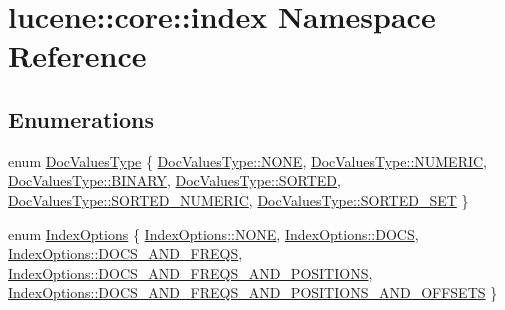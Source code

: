 \hypertarget{namespacelucene_1_1core_1_1index}{}\section{lucene\+:\+:core\+:\+:index Namespace Reference}
\label{namespacelucene_1_1core_1_1index}
\subsection*{Enumerations}
\begin{DoxyCompactItemize}
\item 
enum \mbox{\hyperlink{namespacelucene_1_1core_1_1index_a2f7ffaef6429b5df542c8aa12f8b9883}{Doc\+Values\+Type}} \{ \newline
\mbox{\hyperlink{namespacelucene_1_1core_1_1index_a2f7ffaef6429b5df542c8aa12f8b9883ab50339a10e1de285ac99d4c3990b8693}{Doc\+Values\+Type\+::\+N\+O\+NE}}, 
\mbox{\hyperlink{namespacelucene_1_1core_1_1index_a2f7ffaef6429b5df542c8aa12f8b9883ab22f521f17b09d0fd389e231f8f6d66d}{Doc\+Values\+Type\+::\+N\+U\+M\+E\+R\+IC}}, 
\mbox{\hyperlink{namespacelucene_1_1core_1_1index_a2f7ffaef6429b5df542c8aa12f8b9883a98ad0e8750ae10ad556ed7a62affb452}{Doc\+Values\+Type\+::\+B\+I\+N\+A\+RY}}, 
\mbox{\hyperlink{namespacelucene_1_1core_1_1index_a2f7ffaef6429b5df542c8aa12f8b9883a98c9ebf97fd64620520cc3f0386ebaf0}{Doc\+Values\+Type\+::\+S\+O\+R\+T\+ED}}, 
\newline
\mbox{\hyperlink{namespacelucene_1_1core_1_1index_a2f7ffaef6429b5df542c8aa12f8b9883a8dc1cbb371f983d43d5e233c1e162d77}{Doc\+Values\+Type\+::\+S\+O\+R\+T\+E\+D\+\_\+\+N\+U\+M\+E\+R\+IC}}, 
\mbox{\hyperlink{namespacelucene_1_1core_1_1index_a2f7ffaef6429b5df542c8aa12f8b9883a611320586b4623e36ed6224b139c0ce7}{Doc\+Values\+Type\+::\+S\+O\+R\+T\+E\+D\+\_\+\+S\+ET}}
 \}
\item 
enum \mbox{\hyperlink{namespacelucene_1_1core_1_1index_a0d5e1f98471a76de106056cf3b5a7897}{Index\+Options}} \{ \newline
\mbox{\hyperlink{namespacelucene_1_1core_1_1index_a0d5e1f98471a76de106056cf3b5a7897ab50339a10e1de285ac99d4c3990b8693}{Index\+Options\+::\+N\+O\+NE}}, 
\mbox{\hyperlink{namespacelucene_1_1core_1_1index_a0d5e1f98471a76de106056cf3b5a7897a08620c63dc8aceb49b96261c22451e32}{Index\+Options\+::\+D\+O\+CS}}, 
\mbox{\hyperlink{namespacelucene_1_1core_1_1index_a0d5e1f98471a76de106056cf3b5a7897a9e748623342cd7736ac65c4cc7595a9e}{Index\+Options\+::\+D\+O\+C\+S\+\_\+\+A\+N\+D\+\_\+\+F\+R\+E\+QS}}, 
\mbox{\hyperlink{namespacelucene_1_1core_1_1index_a0d5e1f98471a76de106056cf3b5a7897aa1a3cad49f8bf9ffa47f0e8eb9a8b577}{Index\+Options\+::\+D\+O\+C\+S\+\_\+\+A\+N\+D\+\_\+\+F\+R\+E\+Q\+S\+\_\+\+A\+N\+D\+\_\+\+P\+O\+S\+I\+T\+I\+O\+NS}}, 
\newline
\mbox{\hyperlink{namespacelucene_1_1core_1_1index_a0d5e1f98471a76de106056cf3b5a7897ac4c804adbceb805cb01f4c4cbaca5704}{Index\+Options\+::\+D\+O\+C\+S\+\_\+\+A\+N\+D\+\_\+\+F\+R\+E\+Q\+S\+\_\+\+A\+N\+D\+\_\+\+P\+O\+S\+I\+T\+I\+O\+N\+S\+\_\+\+A\+N\+D\+\_\+\+O\+F\+F\+S\+E\+TS}}
 \}
\end{DoxyCompactItemize}


